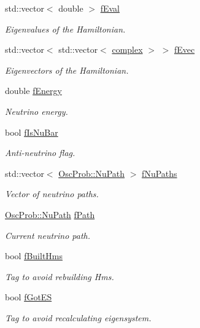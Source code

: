 \begin{DoxyCompactItemize}
std\+::vector$<$ double $>$ \hyperlink{classOscProb_1_1PMNS__Base_a6319c34d7decbb9d7d6da279c06e8c2d}{f\+Eval}
\begin{DoxyCompactList}\small\item\em Eigenvalues of the Hamiltonian. \end{DoxyCompactList}\item 
std\+::vector$<$ std\+::vector$<$ \hyperlink{classOscProb_1_1PMNS__Base_ae86ec4718808ce9d02e5f5b4226714ab}{complex} $>$ $>$ \hyperlink{classOscProb_1_1PMNS__Base_a093e7bd31d4ef52ed52df414e12c1d17}{f\+Evec}
\begin{DoxyCompactList}\small\item\em Eigenvectors of the Hamiltonian. \end{DoxyCompactList}\item 
double \hyperlink{classOscProb_1_1PMNS__Base_a2800af6d436972f3e900867790c046b0}{f\+Energy}
\begin{DoxyCompactList}\small\item\em Neutrino energy. \end{DoxyCompactList}\item 
bool \hyperlink{classOscProb_1_1PMNS__Base_a0ebaeaefab36a3ff381c6293faedfdd6}{f\+Is\+Nu\+Bar}
\begin{DoxyCompactList}\small\item\em Anti-\/neutrino flag. \end{DoxyCompactList}\item 
std\+::vector$<$ \hyperlink{structOscProb_1_1NuPath}{Osc\+Prob\+::\+Nu\+Path} $>$ \hyperlink{classOscProb_1_1PMNS__Base_a69db9d57e12fc7cbe0431bc6c18fac93}{f\+Nu\+Paths}
\begin{DoxyCompactList}\small\item\em Vector of neutrino paths. \end{DoxyCompactList}\item 
\hyperlink{structOscProb_1_1NuPath}{Osc\+Prob\+::\+Nu\+Path} \hyperlink{classOscProb_1_1PMNS__Base_a849437aa8891fe042e86886ce8f81c6e}{f\+Path}
\begin{DoxyCompactList}\small\item\em Current neutrino path. \end{DoxyCompactList}\item 
bool \hyperlink{classOscProb_1_1PMNS__Base_a9ac3cadeac8db1b90f3152f476244780}{f\+Built\+Hms}
\begin{DoxyCompactList}\small\item\em Tag to avoid rebuilding Hms. \end{DoxyCompactList}\item 
bool \hyperlink{classOscProb_1_1PMNS__Base_a6dc5cd010d2d70b2324745b4e53e9839}{f\+Got\+ES}
\begin{DoxyCompactList}\small\item\em Tag to avoid recalculating eigensystem. \end{DoxyCompactList}\end{DoxyCompactItemize}
